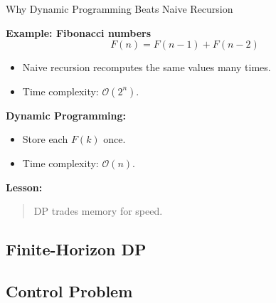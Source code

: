 \documentclass[aspectratio=169]{beamer}
\begin{document}
\begin{frame}{Why Dynamic Programming Beats Naive Recursion}

\textbf{Example: Fibonacci numbers}
\[
F(n)=F(n-1)+F(n-2)
\]

\medskip
\begin{itemize}
  \item Naive recursion recomputes the same values many times.\pause
  \item Time complexity: \(\mathcal{O}(2^n)\).\pause
\end{itemize}

\medskip
\textbf{Dynamic Programming:}
\begin{itemize}
  \item Store each \(F(k)\) once.\pause
  \item Time complexity: \(\mathcal{O}(n)\).
\end{itemize}

\medskip
\textbf{Lesson:}
\begin{quote}
DP trades memory for speed.
\end{quote}

\end{frame}





\subsection{Finite-Horizon DP}

\subsection{Control Problem}
\end{document}
